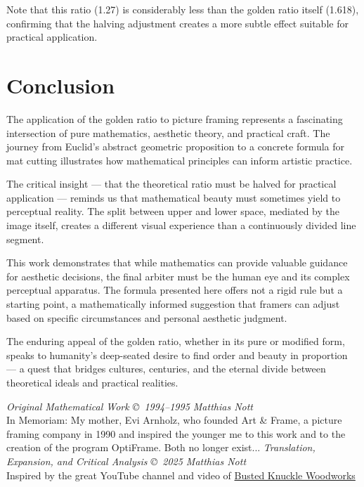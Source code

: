 \documentclass[12pt,a4paper]{article}
\begin{document}
Note that this ratio (1.27) is considerably less than the golden ratio itself (1.618), confirming that the halving adjustment creates a more subtle effect suitable for practical application.

\section{Conclusion}

The application of the golden ratio to picture framing represents a fascinating intersection of pure mathematics, aesthetic theory, and practical craft. The journey from Euclid's abstract geometric proposition to a concrete formula for mat cutting illustrates how mathematical principles can inform artistic practice.

The critical insight --- that the theoretical ratio must be halved for practical application --- reminds us that mathematical beauty must sometimes yield to perceptual reality. The split between upper and lower space, mediated by the image itself, creates a different visual experience than a continuously divided line segment.

This work demonstrates that while mathematics can provide valuable guidance for aesthetic decisions, the final arbiter must be the human eye and its complex perceptual apparatus. The formula presented here offers not a rigid rule but a starting point, a mathematically informed suggestion that framers can adjust based on specific circumstances and personal aesthetic judgment.

The enduring appeal of the golden ratio, whether in its pure or modified form, speaks to humanity's deep-seated desire to find order and beauty in proportion --- a quest that bridges cultures, centuries, and the eternal divide between theoretical ideals and practical realities.

\vspace{1cm}
\noindent\textit{Original Mathematical Work \copyright\ 1994--1995 Matthias Nott}\\
In Memoriam: My mother, Evi Arnholz, who founded Art \& Frame, a picture framing company in 1990 and inspired the younger me to this work and to the creation of the program OptiFrame. Both no longer exist...
\newline
\newline
\textit{Translation, Expansion, and Critical Analysis \copyright\ 2025 Matthias Nott}\\
Inspired by the great YouTube channel and video of \href{https://www.youtube.com/watch?v=bKMEDZp7ZZs}{Busted Knuckle Woodworks}
\end{document}
